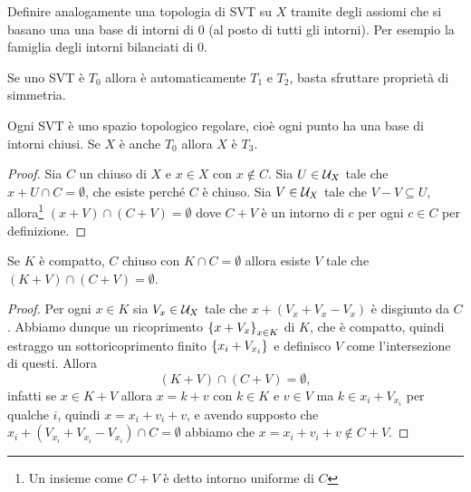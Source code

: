 \begin{exercise}
Definire analogamente una topologia di SVT su $X$ tramite degli assiomi che si basano una una base di intorni di $0$ (al posto di tutti gli intorni). Per esempio la famiglia degli intorni bilanciati di $0$.
\end{exercise}

\begin{remark}
Se uno SVT \`e $T_0$ allora \`e automaticamente $T_1$ e $T_2$, basta sfruttare propriet\`a di simmetria.
\end{remark}

\begin{remark}
Ogni SVT \`e uno spazio topologico regolare, cio\`e ogni punto ha una base di intorni chiusi. Se $X$ \`e anche $T_0$ allora $X$ \`e $T_3$.
\end{remark}
\begin{proof}
Sia $C$ un chiuso di $X$ e $x\in X$ con $x\notin C$. Sia $U\in\mathcal{U}_X$ tale che $x+U\cap C=\emptyset$, che esiste perch\'e $C$ \`e chiuso. Sia $V\in \mathcal{U}_X$ tale che $V-V\subseteq U$, allora\footnote{Un insieme come $C+V$ \`e detto intorno uniforme di $C$} $(x+V)\cap (C+V)=\emptyset$ dove $C+V$ \`e un intorno di $c$ per ogni $c\in C$ per definizione.
\end{proof}

\begin{remark}\label{PrSeparoCompattoEChiusoDisgiunti}
Se $K$ \`e compatto, $C$ chiuso con $K\cap C=\emptyset$ allora esiste $V$ tale che $(K+V)\cap (C+V)=\emptyset$.
\end{remark}
\begin{proof}
Per ogni $x\in K$ sia $V_x\in \mathcal{U}_X$ tale che $x+(V_x+V_x-V_x)$ \`e disgiunto da $C$. Abbiamo dunque un ricoprimento $\left\{{x+V_x}\right\}_{x\in K}$ di $K$, che \`e compatto, quindi estraggo un sottoricoprimento finito $\left\{{x_i+V_{x_i}}\right\}$ e definisco $V$ come l'intersezione di questi. Allora
\[(K+V)\cap (C+V)=\emptyset,\]
infatti se $x\in K+V$ allora $x=k+v$ con $k\in K$ e $v\in V$ ma $k\in x_i+V_{x_i}$ per qualche $i$, quindi $x=x_i+v_i+v$, e avendo supposto che $x_i+(V_{x_i}+V_{x_i}-V_{x_i})\cap C=\emptyset$ abbiamo che $x=x_i+v_i+v\notin C+V$.
\end{proof}


